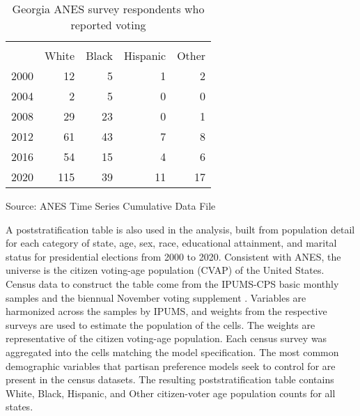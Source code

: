 \begin{table}[ht]
\centering
\begin{threeparttable}
\caption{Georgia ANES survey respondents who reported voting}
\label{table:ANES-respondents-race}
\begin{tabular}{rrrrr}
  \hline \\ \vspace{0.45em}
 & White & Black & Hispanic & Other \vspace{0.45em}\\
\hline
  2000 &  12 &   5 &   1 &   2 \\ 
  2004 &   2 &   5 &   0 &   0 \\ 
  2008 &  29 &  23 &   0 &   1 \\ 
  2012 &  61 &  43 &   7 &   8 \\ 
  2016 &  54 &  15 &   4 &   6 \\ 
  2020 & 115 &  39 &  11 &  17 \\ 
   \hline
\end{tabular}
{\footnotesize Source: ANES Time Series Cumulative Data File}
\end{threeparttable}
\end{table}

A poststratification table is also used in the analysis, built from population detail for each category of state, age, sex, race, educational attainment, and marital status for presidential elections from 2000 to 2020. Consistent with ANES, the universe is the citizen voting-age population (CVAP) of the United States. Census data to construct the table come from the IPUMS-CPS basic monthly samples and the biennual November voting supplement \citep{ruggles_ipums_2021}. Variables are harmonized across the samples by IPUMS, and weights from the respective surveys are used to estimate the population of the cells. The weights are representative of the citizen voting-age population. Each census survey was aggregated into the cells matching the model specification. The most common demographic variables that partisan preference models seek to control for are present in the census datasets. The resulting poststratification table contains White, Black, Hispanic, and Other citizen-voter age population counts for all states. 

